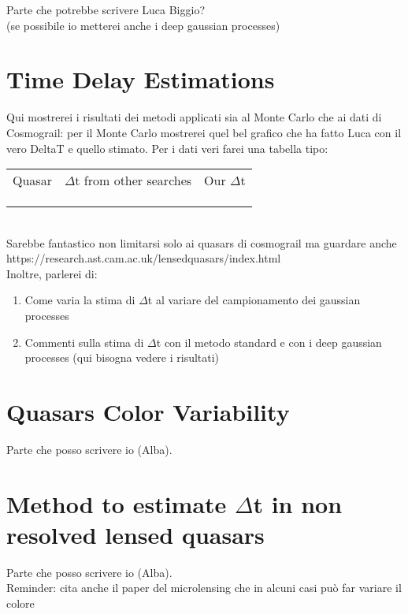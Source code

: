 \documentclass[twoside,twocolumn]{article}
\begin{document}
Parte che potrebbe scrivere Luca Biggio?
\\
(se possibile io metterei anche i deep gaussian processes)



\section{Time Delay Estimations}
 
 Qui mostrerei i risultati dei metodi applicati sia al Monte Carlo che ai dati di Cosmograil: per il Monte Carlo mostrerei quel bel grafico che ha fatto Luca con il vero DeltaT e quello stimato. Per i dati veri farei una tabella tipo:
 \begin{table}[h]
 	\begin{tabular}{c|c|c}
 	Quasar	& $\Delta$t from other searches &  Our $\Delta$t  \\
 		&  &    \\
 		&  &  \\
 		&  & 
 	\end{tabular}
 \end{table}
\\
Sarebbe fantastico non limitarsi solo ai quasars di cosmograil ma guardare anche https://research.ast.cam.ac.uk/lensedquasars/index.html
\\
Inoltre, parlerei di: 
\begin{enumerate}
	\item Come varia la stima di $\Delta$t al variare del campionamento dei gaussian processes
	\item Commenti sulla stima di $\Delta$t con il metodo standard e con i deep gaussian processes (qui bisogna vedere i risultati)
\end{enumerate} 


\section{Quasars Color Variability}
Parte che posso scrivere io (Alba).

\section{Method to estimate $\Delta$t in non resolved lensed quasars}
Parte che posso scrivere io (Alba).
\\
Reminder: cita anche il paper del microlensing che in alcuni casi può far variare il colore
\end{document}
